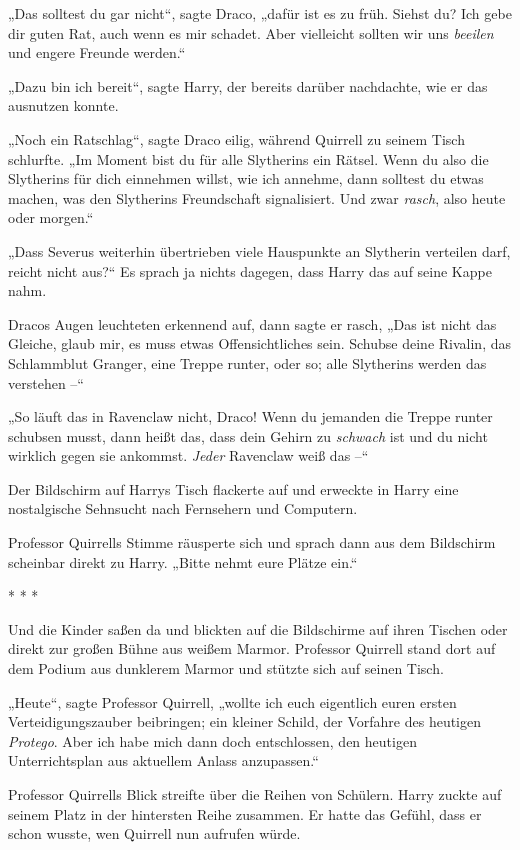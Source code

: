 {„Das solltest du gar nicht“, sagte Draco, „dafür ist es zu früh. Siehst du? Ich gebe dir guten Rat, auch wenn es mir schadet. Aber vielleicht sollten wir uns \emph{beeilen} und engere Freunde werden.“

„Dazu bin ich bereit“, sagte Harry, der bereits darüber nachdachte, wie er das ausnutzen konnte.

„Noch ein Ratschlag“, sagte Draco eilig, während Quirrell zu seinem Tisch schlurfte. „Im Moment bist du für alle Slytherins ein Rätsel. Wenn du also die Slytherins für dich einnehmen willst, wie ich annehme, dann solltest du etwas machen, was den Slytherins Freundschaft signalisiert. Und zwar \emph{rasch}, also heute oder morgen.“

„Dass Severus weiterhin übertrieben viele Hauspunkte an Slytherin verteilen darf, reicht nicht aus?“ Es sprach ja nichts dagegen, dass Harry das auf seine Kappe nahm.

Dracos Augen leuchteten erkennend auf, dann sagte er rasch, „Das ist nicht das Gleiche, glaub mir, es muss etwas Offensichtliches sein. Schubse deine Rivalin, das Schlammblut Granger, eine Treppe runter, oder so; alle Slytherins werden das verstehen --“

„So läuft das in Ravenclaw nicht, Draco! Wenn du jemanden die Treppe runter schubsen musst, dann heißt das, dass dein Gehirn zu \emph{schwach} ist und du nicht wirklich gegen sie ankommst. \emph{Jeder} Ravenclaw weiß das --“

Der Bildschirm auf Harrys Tisch flackerte auf und erweckte in Harry eine nostalgische Sehnsucht nach Fernsehern und Computern.

Professor Quirrells Stimme räusperte sich und sprach dann aus dem Bildschirm scheinbar direkt zu Harry. „Bitte nehmt eure Plätze ein.“

* * *

Und die Kinder saßen da und blickten auf die Bildschirme auf ihren Tischen oder direkt zur großen Bühne aus weißem Marmor. Professor Quirrell stand dort auf dem Podium aus dunklerem Marmor und stützte sich auf seinen Tisch.

„Heute“, sagte Professor Quirrell, „wollte ich euch eigentlich euren ersten Verteidigungszauber beibringen; ein kleiner Schild, der Vorfahre des heutigen \emph{Protego}. Aber ich habe mich dann doch entschlossen, den heutigen Unterrichtsplan aus aktuellem Anlass anzupassen.“

Professor Quirrells Blick streifte über die Reihen von Schülern. Harry zuckte auf seinem Platz in der hintersten Reihe zusammen. Er hatte das Gefühl, dass er schon wusste, wen Quirrell nun aufrufen würde.

}
